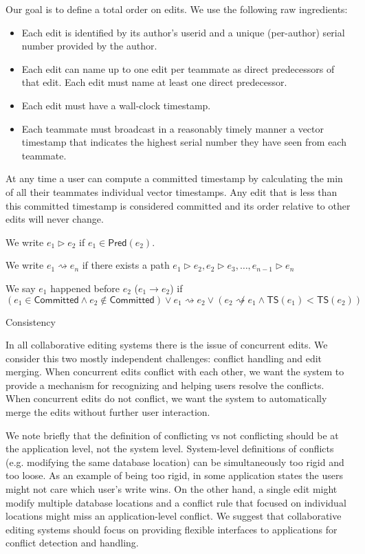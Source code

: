 \documentclass{article}
\begin{document}
Our goal is to define a total order on edits.
We use the following raw ingredients:

\begin{itemize}
\item Each edit is identified by its author's userid and a unique (per-author) serial number provided by the author.
\item Each edit can name up to one edit per teammate as direct predecessors of that edit.
  Each edit must name at least one direct predecessor.
\item Each edit must have a wall-clock timestamp.
\item Each teammate must broadcast in a reasonably timely manner a vector timestamp that indicates the highest serial number they have seen from each teammate.
\end{itemize}

At any time a user can compute a committed timestamp by calculating the min of all their teammates individual vector timestamps.
Any edit that is less than this committed timestamp is considered committed and its order relative to other edits will never change.

We write $e_1{\rhd}e_2$ if $e_1 \in \mathsf{Pred}(e_2)$.

We write $e_1{\rightsquigarrow}e_n$ if there exists a path $e_1{\rhd}e_2, e_2{\rhd}e_3, \ldots, e_{n-1}{\rhd}e_n$

We say $e_1$ happened before $e_2$ ($e_1{\rightarrow}e_2$) if $(e_1 \in \mathsf{Committed} \land e_2 \not\in \mathsf{Committed}) \lor e_1{\rightsquigarrow}e_2 \lor (e_2{\not\rightsquigarrow}e_1 \land \mathsf{TS}(e_1)<\mathsf{TS}(e_2))$










Consistency

In all collaborative editing systems there is the issue of concurrent edits.
We consider this two mostly independent challenges: conflict handling and edit merging.
When concurrent edits conflict with each other, we want the system to provide a mechanism for recognizing and helping users resolve the conflicts.
When concurrent edits do not conflict, we want the system to automatically merge the edits without further user interaction.

We note briefly that the definition of conflicting vs not conflicting should be at the application level, not the system level.
System-level definitions of conflicts (e.g. modifying the same database location) can be simultaneously too rigid and too loose.
As an example of being too rigid, in some application states the users might not care which user's write wins.
On the other hand, a single edit might modify multiple database locations and a conflict rule that focused on individual locations might miss an application-level conflict.
We suggest that collaborative editing systems should focus on providing flexible interfaces to applications for conflict detection and handling.
\end{document}
